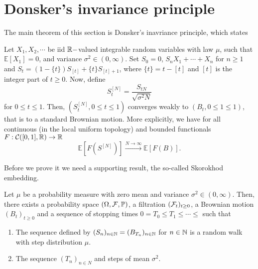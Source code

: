 \documentclass{article}
\begin{document}
	\section{Donsker's invariance principle}\label{sec: Donsker}
The main theorem of this section is Donsker's inavriance principle, which states 
\begin{theorem}\label{thm: donsker}
	Let $ X_{1}, X_{2}, \cdots$ be iid $ \mathbb{R}-$valued integrable random variables with law $ \mu$, such that $ \mathbb{E}\left[ X_{1} \right]=0$, and variance $ \sigma^{2}\in (0,\infty)$. Set $ S_{0}=0$, $ S_{n} X_{1}+\cdots +X_{n}$ for $ n\geq 1$ and $ S_{t} = (1-\{t\})S_{[t]}+\{t\}S_{[t]+1}$, where $ \{t\}= t-[t]$ and $ [t]$ is the integer part of $ t\geq 0$. Now, define 
	\[
		S^{[N]}_{t} = \frac{S_{tN}}{\sqrt{\sigma^{2}N}}
	\]
	for $ 0\leq t\leq 1$. Then, $ \left(  S^{[N]}_{t}, 0\leq t\leq 1\right)$ converges weakly to $ (B_{t}, 0\leq 1\leq 1)$, that is to a standard Brownian motion. More explicitly, we have for all continuous (in the local uniform topology) and bounded functionals $ F: \mathcal{C}([0,1], \mathbb{R})\to \mathbb{R}$
	\[
	\mathbb{E}\left[ F(S^{[N]}) \right] \stackrel{N\to \infty}{\longrightarrow} \mathbb{E}\left[ F(B) \right].
	\]
\end{theorem}
	Before we prove it we need a supporting result, the so-called Skorokhod embedding.

	\begin{theorem}\label{thm: skorokhod embedding}
	Let $ \mu$ be a probability measure with zero mean and variance $ \sigma^{2}\in (0,\infty)$. Then, there exists a probability space $ (\Omega, \mathcal{F}, \mathbb{P})$, a filtration $ (\mathcal{F}_{t})_{t\geq 0}$, a Brownian motion $ (B_{t})_{t\geq 0}$ and a sequence of stopping times $ 0=T_{0}\leq T_{1}\leq \cdots\leq$ such that
	\begin{enumerate}
		\item The sequence defined by $ (S_{n})_{n\in \mathbb{N}} = (B_{T_{n}})_{n\in \mathbb{N}}$ for $ n\in \mathbb{N}$ is a random walk with step distribution $ \mu$.
		\item The sequence $ (T_{n})_{n\in N}$ and steps of mean $ \sigma^{2}$.
 
	\end{enumerate}
\end{theorem}
\end{document}
